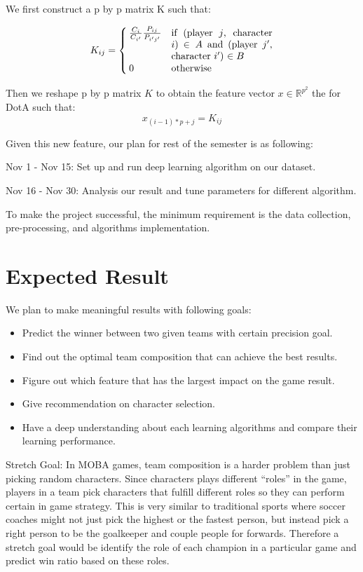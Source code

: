 \documentclass[conference]{IEEEtran}
\begin{document}
We first construct a p by p matrix K such that:

\begin{equation*}
K_{ij} =
    \begin{cases}
        \frac{C_i}{C_{i'}} \frac{P_{ij}}{P_{i'j'}} & \parbox[t]{.3\textwidth}{if (player $j$, character $i$) $\in A$ and (player $j'$, character $i'$) $\in B$  }\\
        0 & \text{otherwise}
    \end{cases}
\end{equation*}

Then we reshape p by p matrix $K$ to obtain the feature vector $x \in \mathbb{R}^{p^2}$ the for DotA such that:
\[
x_{(i-1)*p + j} = K_{ij}
\]

Given this new feature, our plan for rest of the semester is as following:

Nov 1 - Nov 15: Set up and run deep learning algorithm on our dataset.

Nov 16 - Nov 30: Analysis our result and tune parameters for different algorithm.

To make the project successful, the minimum requirement is the data collection, pre-processing, and algorithms implementation.

\section{Expected Result}
We plan to make meaningful results with following goals:

\begin{itemize}
  \item Predict the winner between two given teams with certain precision goal.
  \item Find out the optimal team composition that can achieve the best results.
  \item Figure out which feature that has the largest impact on the game result.
  \item Give recommendation on character selection.
  \item Have a deep understanding about each learning algorithms and compare their learning performance.
\end{itemize}

Stretch Goal:
In MOBA games, team composition is a harder problem than just picking random characters. Since characters plays different ``roles'' in the game, players in a team pick characters that fulfill different roles so they can perform certain in game strategy. This is very similar to traditional sports where soccer coaches might not just pick the highest or the fastest person, but instead pick a right person to be the goalkeeper and couple people for forwards. Therefore a stretch goal would be identify the role of each champion in a particular game and predict win ratio based on these roles.
\end{document}
